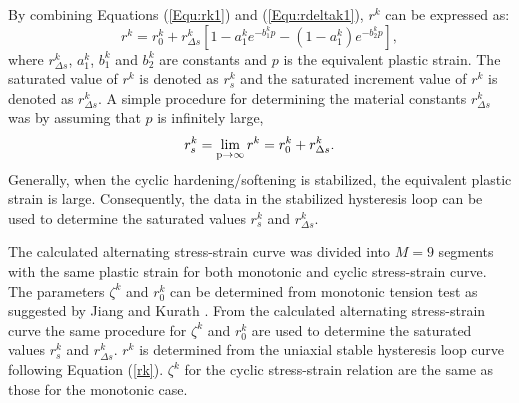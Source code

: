 \documentclass[preprint,5p,twocolumn,11pt,sort&compress]{elsarticle}
\begin{document}
By combining Equations (\ref{Equ:rk1}) and (\ref{Equ:rdeltak1}), $r^k$ can be expressed as:
\begin{equation}\label{rk}
{r^k} = r_0^k + r_{\Delta s}^k\left[ {1 - a_1^k{e^{ - b_1^kp}} - (1-a_1^k){e^{ - b_2^kp}} }\right],
\end{equation}
where $r_{\Delta s}^k$, $a_1^k$, $b_1^k$ and $b_2^k$ are  constants and $p$ is the equivalent plastic strain.
The saturated value of $r^k$ is denoted as $r^k_s$ and the saturated increment value of $r^k$ is denoted as $r^k_{\Delta s}$.
A simple procedure for determining the material constants $r_{\Delta s}^k$ was by assuming that $p$ is infinitely large,
\begin{equation}
r_s^k=\mathop {\lim }\limits_{{\rm{p}} \to \infty } {r^k} = r_0^k + r_{\Delta s}^k.
\label{Equ:rsk}
\end{equation}
Generally, when the cyclic hardening/softening is stabilized, the equivalent plastic strain is large.
Consequently, the data in the stabilized hysteresis loop can be used to determine the saturated values $r^k_s$ and $r^k_{\Delta s}$.

The calculated alternating stress-strain curve was  divided into $M=9$ segments with the same plastic strain for both monotonic and cyclic stress-strain curve. The parameters $\zeta^k$ and $r_0^k$ can be determined from monotonic tension test as suggested by Jiang and Kurath \cite{Jiang1996387}. From the calculated alternating stress-strain curve the same procedure for $\zeta^k$ and $r_0^k$ are used to determine the saturated values $r^k_s$ and $r^k_{\Delta s}$.  $r^k$ is determined from the uniaxial stable hysteresis loop curve following Equation (\ref{rk}). ${\zeta ^k}$ for the cyclic stress-strain relation are the same as those for the monotonic case.

\end{document}
